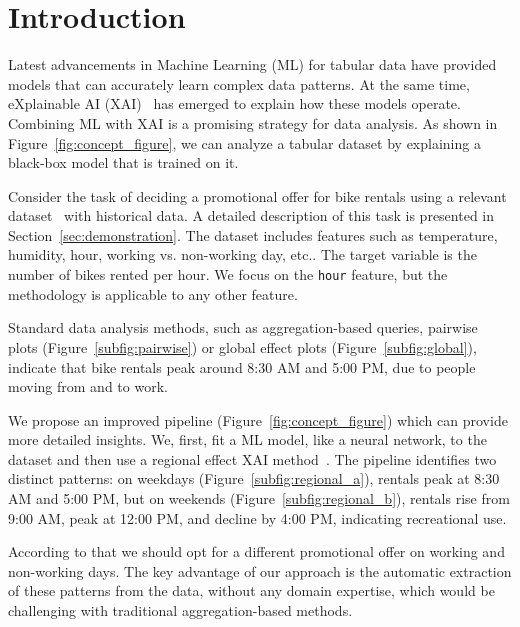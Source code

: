 \documentclass[
twocolumn,
]{ceurart}
\begin{document}
\maketitle


\section{Introduction}
\label{sec:introduction}

Latest advancements in Machine Learning (ML) for tabular data have provided models that can accurately learn complex data patterns.
At the same time, eXplainable AI (XAI)~\cite{freiesleben2022scientific, ribeiro2016should} has emerged to explain how these models operate.
Combining ML with XAI is a promising strategy for data analysis. As shown in Figure~\ref{fig:concept_figure}, we can analyze a tabular dataset by explaining a black-box model that is trained on it.

Consider the task of deciding a promotional offer for bike rentals using a relevant dataset~\cite{fanaee2014event} with historical data. A detailed description of this task is presented in Section~\ref{sec:demonstration}. The dataset includes features such as temperature, humidity, hour, working vs. non-working day, etc.. The target variable is the number of bikes rented per hour. We focus on the \texttt{hour} feature, but the methodology is applicable to any other feature.

Standard data analysis methods, such as aggregation-based queries, pairwise plots (Figure~\ref{subfig:pairwise}) or global effect plots (Figure~\ref{subfig:global}), indicate that bike rentals peak around 8:30 AM and 5:00 PM, due to people moving from and to work.

We propose an improved pipeline (Figure~\ref{fig:concept_figure}) which can provide more detailed insights. We, first, fit a ML model, like a neural network, to the dataset and then use a regional effect XAI method~\cite{herbinger2023decomposing, herbinger_repid_2022, britton2019vine, scholbeck2024marginal, hu2020surrogate}.
The pipeline identifies two distinct patterns: on weekdays (Figure~\ref{subfig:regional_a}), rentals peak at 8:30 AM and 5:00 PM, but on weekends (Figure~\ref{subfig:regional_b}), rentals rise from 9:00 AM, peak at 12:00 PM, and decline by 4:00 PM, indicating recreational use.

According to that we should opt for a different promotional offer on working and non-working days. The key advantage of our approach is the automatic extraction of these patterns from the data, without any domain expertise, which would be challenging with traditional aggregation-based methods.
\end{document}

